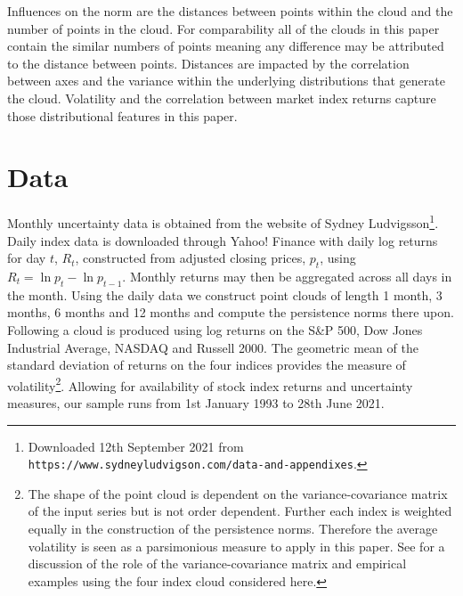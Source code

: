 \documentclass{article}
\begin{document}
Influences on the norm are the distances between points within the cloud and the number of points in the cloud. For comparability all of the clouds in this paper contain the similar numbers of points meaning any difference may be attributed to the distance between points. Distances are impacted by the correlation between axes and the variance within the underlying distributions that generate the cloud. Volatility and the correlation between market index returns capture those distributional features in this paper.

\section{Data}

Monthly uncertainty data is obtained from the website of Sydney Ludvigsson\footnote{Downloaded 12th September 2021 from \texttt{https://www.sydneyludvigson.com/data-and-appendixes}.}. Daily index data is downloaded through Yahoo! Finance with daily log returns for day $t$, $R_t$, constructed from adjusted closing prices, $p_t$, using $R_t = \ln{p_t} - \ln{p_{t-1}}$. Monthly returns may then be aggregated across all days in the month. Using the daily data we construct point clouds of length 1 month, 3 months, 6 months and 12 months and compute the persistence norms there upon. Following \cite{gidea2018topological} a cloud is produced using log returns on the S\&P 500, Dow Jones Industrial Average, NASDAQ and Russell 2000. The geometric mean of the standard deviation of returns on the four indices provides the measure of volatility\footnote{The shape of the point cloud is dependent on the variance-covariance matrix of the input series but is not order dependent. Further each index is weighted equally in the construction of the persistence norms. Therefore the average volatility is seen as a parsimonious measure to apply in this paper. See \cite{aromi2021topological} for a discussion of the role of the variance-covariance matrix and empirical examples using the four index cloud considered here.}. Allowing for availability of stock index returns and uncertainty measures, our sample runs from 1st January 1993 to 28th June 2021.
\end{document}
